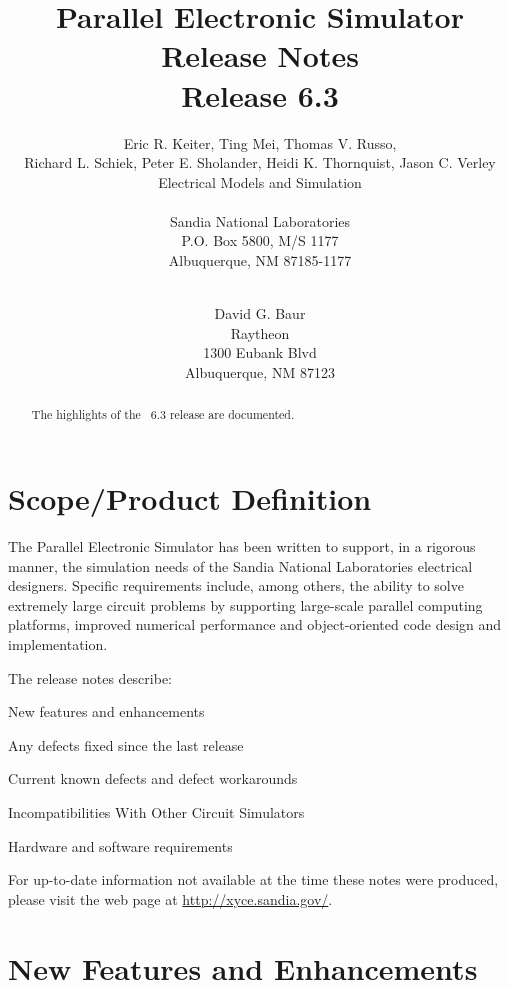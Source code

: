\documentclass[11pt,report,strict]{SANDreport}
\title{\XyceTitle{} Parallel Electronic Simulator Release Notes\\Release 6.3}
\date{}
\author{Eric R. Keiter, 
            Ting Mei, 
            Thomas V. Russo, \\
            Richard L. Schiek, 
            Peter E. Sholander,
            Heidi K. Thornquist,
            Jason C. Verley\\
            Electrical Models and Simulation \\[1ex]
\\
            Sandia National Laboratories\\
            P.O. Box 5800, M/S 1177\\
            Albuquerque, NM 87185-1177 \\
\\
\and 
David G. Baur\\
  Raytheon\\
  1300 Eubank Blvd\\
  Albuquerque, NM 87123 \\
}
\begin{document}
\maketitle
\begin{abstract}
  The highlights of the \XyceTM\ 6.3 release are documented.
\end{abstract}
\cleardoublepage
\tableofcontents


%
\SANDmain		%
\section{Scope/Product Definition}

The \Xyce{} Parallel Electronic Simulator has been written to support, in a
rigorous manner, the simulation needs of the Sandia National Laboratories
electrical designers.  Specific requirements include, among others, the
ability to solve extremely large circuit problems by supporting large-scale
parallel computing platforms, improved numerical performance and
object-oriented code design and implementation.

The \Xyce{} release notes describe:
\begin{XyceItemize}
  \item New features and enhancements
  \item Any defects fixed since the last release
  \item Current known defects and defect workarounds
  \item Incompatibilities With Other Circuit Simulators
  \item Hardware and software requirements
\end{XyceItemize}

For up-to-date information not available at the time these notes 
were produced, please visit the \Xyce{} web page at 
{\color{XyceDeepRed}\url{http://xyce.sandia.gov/}}.


\section{New Features and Enhancements}
\end{document}
